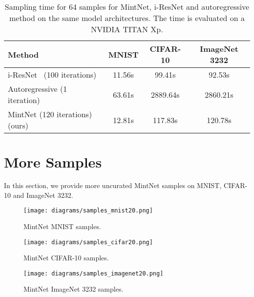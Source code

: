 \documentclass{article}
\begin{document}
\begin{table}[H]
 \caption{Sampling time for 64 samples for MintNet, i-ResNet and autoregressive method on the same model architectures. The time is evaluated on a NVIDIA TITAN Xp.} \label{tab:sample_time}
\begin{center}
    \begin{tabular}{p{5cm} c c c}
        \toprule
        Method & MNIST & CIFAR-10 & ImageNet 3232\\
        \midrule
        i-ResNet~\cite{i-resnet} (100 iterations) 
&11.56s &99.41s &92.53s\\ 
        Autoregressive (1 iteration) &63.61s &2889.64s &2860.21s\\
        \midrule
        MintNet (120 iterations) (ours) 
&12.81s  &117.83s  &120.78s\\
        \bottomrule
    \end{tabular} 
\end{center}
\end{table}
\FloatBarrier
\vfill
\clearpage
\section{More Samples}
\label{app:samples}
In this section, we provide more uncurated MintNet samples on MNIST, CIFAR-10 and ImageNet 3232.
\vspace*{\fill}
\FloatBarrier
\begin{figure}[H]
\centering
\texttt{[image: diagrams/samples\_mnist20.png]}
\caption{MintNet MNIST samples.}
\label{fig:samples_mnist}
\end{figure}
\FloatBarrier
\vfill
\vspace*{\fill}
\FloatBarrier
\begin{figure}
\centering
\texttt{[image: diagrams/samples\_cifar20.png]}
\caption{MintNet CIFAR-10 samples.}
\label{fig:samples_cifar10}
\end{figure}

\begin{figure}
\centering
\texttt{[image: diagrams/samples\_imagenet20.png]}
\caption{MintNet ImageNet 3232 samples.}
\label{fig:samples_imagenet32}
\end{figure}
\FloatBarrier
\vfill 
\end{document}
